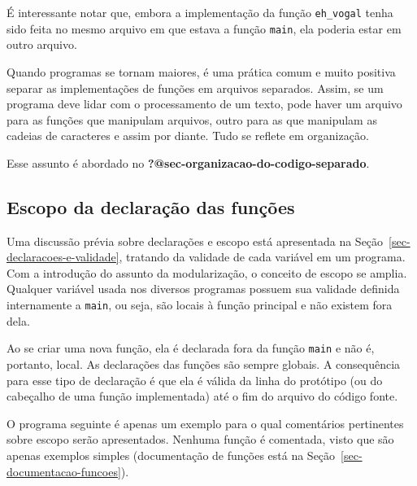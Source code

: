 \documentclass[
  11pt,
  a4paper,
]{scrbook}
\begin{document}
\begin{tcolorbox}[enhanced jigsaw, arc=.35mm, bottomtitle=1mm, colbacktitle=quarto-callout-note-color!10!white, title=\textcolor{quarto-callout-note-color}{\faInfo}\hspace{0.5em}{Curiosidade}, toprule=.15mm, left=2mm, opacityback=0, colback=white, colframe=quarto-callout-note-color-frame, opacitybacktitle=0.6, bottomrule=.15mm, leftrule=.75mm, toptitle=1mm, coltitle=black, titlerule=0mm, rightrule=.15mm, breakable]

É interessante notar que, embora a implementação da função
\texttt{eh\_vogal} tenha sido feita no mesmo arquivo em que estava a
função \texttt{main}, ela poderia estar em outro arquivo.

Quando programas se tornam maiores, é uma prática comum e muito positiva
separar as implementações de funções em arquivos separados. Assim, se um
programa deve lidar com o processamento de um texto, pode haver um
arquivo para as funções que manipulam arquivos, outro para as que
manipulam as cadeias de caracteres e assim por diante. Tudo se reflete
em organização.

Esse assunto é abordado no
\textbf{?@sec-organizacao-do-codigo-separado}.

\end{tcolorbox}

\subsection{Escopo da declaração das
funções}\label{sec-escopo-da-declaracao-de-funcoes}

Uma discussão prévia sobre declarações e escopo está apresentada na
Seção~\ref{sec-declaracoes-e-validade}, tratando da validade de cada
variável em um programa. Com a introdução do assunto da modularização, o
conceito de escopo se amplia. Qualquer variável usada nos diversos
programas possuem sua validade definida internamente a \texttt{main}, ou
seja, são locais à função principal e não existem fora dela.

Ao se criar uma nova função, ela é declarada fora da função
\texttt{main} e não é, portanto, local. As declarações das funções são
sempre globais. A consequência para esse tipo de declaração é que ela é
válida da linha do protótipo (ou do cabeçalho de uma função
implementada) até o fim do arquivo do código fonte.

O programa seguinte é apenas um exemplo para o qual comentários
pertinentes sobre escopo serão apresentados. Nenhuma função é comentada,
visto que são apenas exemplos simples (documentação de funções está na
Seção~\ref{sec-documentacao-funcoes}).
\end{document}
